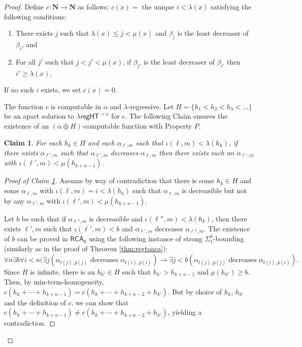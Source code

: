 \documentclass[a4paper,11pt]{article}
\newtheorem{claim}{Claim}
\newcommand\Nat{\mathbf{N}}
\newcommand\RCA{\mathsf{RCA}}
\newcommand\regHT{\mathsf{regHT}}
\begin{document}
\begin{proof}
Define $c:\Nat\to \Nat$ as follows: $c(x)=$ the unique $i < \lambda(x)$ satisfying the following conditions:
\begin{enumerate}
\item There exists $j$ such that $\lambda(x) \leq j < \mu(x)$ and $\beta_j$ is the least decreaser of $\beta_i$, and 
\item For all $j'$ such that $j < j'  < \mu(x)$, if $\beta_{j'}$ is the least decreaser of $\beta_{i'}$ then $i' \geq \lambda(x)$. 
\end{enumerate}
If no such $i$ exists, we set $c(x)=0$.

The function $c$ is computable in $\alpha$ and $\lambda$-regressive. Let $H = \{ h_1 < h_2 < h_3 < \dots \}$ be an apart solution to $\lambda\regHT^{= n}$ for $c$. The following Claim ensures the existence of an $(\alpha \oplus H)$-computable function with Property $P$.

\begin{claim}\label{claim2} For each $h_k\in H$ and each $\alpha_{\ell,m}$ such that $\iota(\ell,m) < \lambda(h_k)$, if there exists $\alpha_{\ell',m}$ such that $\alpha_{\ell',m}$ decreases $\alpha_{\ell,m}$ then there exists such an $\alpha_{\ell',m}$ with $\iota(\ell',m)<\mu(h_{k+n-1})$.
\end{claim}

\begin{proof}[Proof of Claim \ref{claim2}]
Assume by way of contradiction that there is some $h_k \in H$ and some $\alpha_{\ell,m}$ with $\iota(\ell,m)=i < \lambda(h_k)$ such that $\alpha_{\ell,m}$ is decreasible but not by any $\alpha_{\ell',m}$ with $\iota(\ell',m) < \mu(h_{k+n-1})$. 

Let $b$ be such that if $\alpha_{\ell'',m}$ is decreasible and $\iota(\ell'',m) < \lambda(h_k)$, then there exists $\ell',m$ such that $\iota(\ell',m) < b$ and $\alpha_{\ell',m}$ decreases $\alpha_{\ell'',m}$. The existence of $b$ can be proved in $\RCA_0$ using the following instance of strong $\Sigma^0_1$-bounding (similarly as in the proof of Theorem \ref{thm:regtoaca}):
$$ \forall n \exists b \forall i < n ( \exists j (\alpha_{t(j),p(j)} \mbox{ decreases } \alpha_{t(i),p(i)}) \to \exists j < b (\alpha_{t(j),p(j)} \mbox{ decreases } \alpha_{t(i),p(i)}).$$
Since $H$ is infinite, there is an $h_{k'} \in H$ such that $h_{k'} > h_{k+n-1}$ and $\mu(h_{k'}) \geq b$. Then, by min-term-homogeneity, $c(h_k + \cdots + h_{k+n-1}) = c(h_k + \cdots + h_{k+n-2} + h_{k'})$. But by choice of $h_k$, $h_{k'}$ and the definition of $c$, we can show that $c(h_k + \cdots + h_{k+n-1}) \neq c(h_k + \cdots + h_{k+n-2} + h_{k'})$, 
yielding a contradiction.


\end{proof}
\end{proof}
\end{document}
